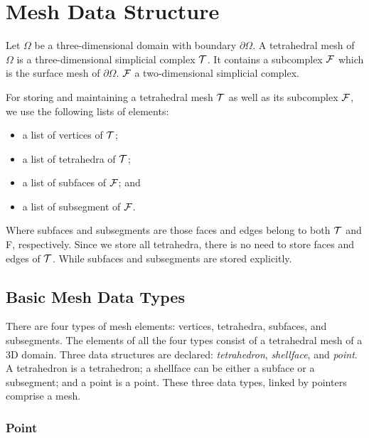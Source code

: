 \chapter{Mesh Data Structure}
\label{chap:meshds}

Let $\Omega$ be a three-dimensional domain with boundary $\partial\Omega$. A tetrahedral mesh of $\Omega$ is a three-dimensional simplicial complex ${\cal T}$. It contains a subcomplex ${\cal F}$ which is the surface mesh of $\partial\Omega$. ${\cal F}$ a two-dimensional simplicial complex.

For storing and maintaining a tetrahedral mesh ${\cal T}$ as well as its subcomplex ${\cal F}$, we use the following lists of elements:
\begin{itemize}
\item a list of vertices of ${\cal T}$;
\item a list of tetrahedra of ${\cal T}$;
\item a list of subfaces of ${\cal F}$; and
\item a list of subsegment of ${\cal F}$.
\end{itemize}
Where subfaces and subsegments are those faces and edges belong to both ${\cal T}$ and {\cal F}, respectively. Since we store all tetrahedra, there is no need to store faces and edges of ${\cal T}$. While subfaces and subsegments are stored explicitly. 

\section{Basic Mesh Data Types}

There are four types of mesh elements: vertices, tetrahedra, subfaces, and subsegments. The elements of all the four types consist of a tetrahedral mesh of a 3D domain.  Three data structures are declared:  {\it tetrahedron}, {\it shellface}, and {\it point}. A tetrahedron is a tetrahedron;  a shellface can be either a subface or a subsegment;  and a point is a point. These three data types, linked by pointers comprise a mesh.

\subsection{Point}

